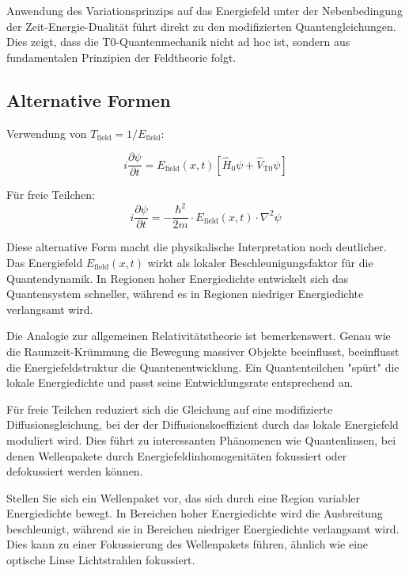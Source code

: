 \documentclass[12pt,a4paper]{article}
\theoremstyle{definition}
\theoremstyle{remark}
\begin{document}
Anwendung des Variationsprinzips auf das Energiefeld unter der Nebenbedingung der Zeit-Energie-Dualität führt direkt zu den modifizierten Quantengleichungen. Dies zeigt, dass die T0-Quantenmechanik nicht ad hoc ist, sondern aus fundamentalen Prinzipien der Feldtheorie folgt.

\subsection{Alternative Formen}

Verwendung von $T_{\text{field}} = 1/E_{\text{field}}$:

\begin{equation}
	\boxed{i \frac{\partial\psi}{\partial t} = E_{\text{field}}(x,t) \left[\hat{H}_0 \psi + \hat{V}_{\text{T0}} \psi\right]}
	\label{eq:t0_schrodinger_energy}
\end{equation}

Für freie Teilchen:
\begin{equation}
	\boxed{i \frac{\partial\psi}{\partial t} = -\frac{\hbar^2}{2m} \cdot E_{\text{field}}(x,t) \cdot \nabla^2 \psi}
	\label{eq:t0_schrodinger_free}
\end{equation}

Diese alternative Form macht die physikalische Interpretation noch deutlicher. Das Energiefeld $E_{\text{field}}(x,t)$ wirkt als lokaler Beschleunigungsfaktor für die Quantendynamik. In Regionen hoher Energiedichte entwickelt sich das Quantensystem schneller, während es in Regionen niedriger Energiedichte verlangsamt wird.

Die Analogie zur allgemeinen Relativitätstheorie ist bemerkenswert. Genau wie die Raumzeit-Krümmung die Bewegung massiver Objekte beeinflusst, beeinflusst die Energiefeldstruktur die Quantenentwicklung. Ein Quantenteilchen "spürt" die lokale Energiedichte und passt seine Entwicklungsrate entsprechend an.

Für freie Teilchen reduziert sich die Gleichung auf eine modifizierte Diffusionsgleichung, bei der der Diffusionskoeffizient durch das lokale Energiefeld moduliert wird. Dies führt zu interessanten Phänomenen wie Quantenlinsen, bei denen Wellenpakete durch Energiefeldinhomogenitäten fokussiert oder defokussiert werden können.

Stellen Sie sich ein Wellenpaket vor, das sich durch eine Region variabler Energiedichte bewegt. In Bereichen hoher Energiedichte wird die Ausbreitung beschleunigt, während sie in Bereichen niedriger Energiedichte verlangsamt wird. Dies kann zu einer Fokussierung des Wellenpakets führen, ähnlich wie eine optische Linse Lichtstrahlen fokussiert.
\end{document}

